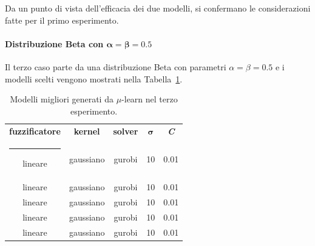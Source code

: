 \documentclass[12pt]{report}
\makeatletter
\theoremstyle{definition}
\newcommand{\thickhline}{%
    \noalign {\ifnum 0=`}\fi \hrule height 1pt
    \futurelet \reserved@a \@xhline
}
\makeatother
\begin{document}
Da un punto di vista dell'efficacia dei due modelli, si confermano le considerazioni fatte per il primo esperimento.

\paragraph{Distribuzione Beta con $\bm{\alpha=\beta=0.5}$}
Il terzo caso parte da una distribuzione Beta con parametri $\alpha=\beta=0.5$ e i modelli scelti vengono mostrati nella Tabella~\ref{models_exp3}.
\begin{table}
\centering
\begin{adjustbox}{max width=\textwidth}
 \begin{tabular}{|c|c|c|c|c|} 
 \hline
\textbf{fuzzificatore} & \textbf{kernel} & \textbf{solver} & $\bm{\sigma}$ & \textit{\textbf{C}}
\\ [0.5ex] 
 \thickhline
 lineare & gaussiano & gurobi & 10 & 0.01 \\
 lineare & gaussiano & gurobi & 10 & 0.01 \\
 lineare & gaussiano & gurobi & 10 & 0.01 \\
 lineare & gaussiano & gurobi & 10 & 0.01 \\
 lineare & gaussiano & gurobi & 10 & 0.01 \\
 \hline
\end{tabular}
\end{adjustbox}
\caption{Modelli migliori generati da $\mu$-learn nel terzo esperimento.}
\label{models_exp3}
\end{table}
\end{document}
